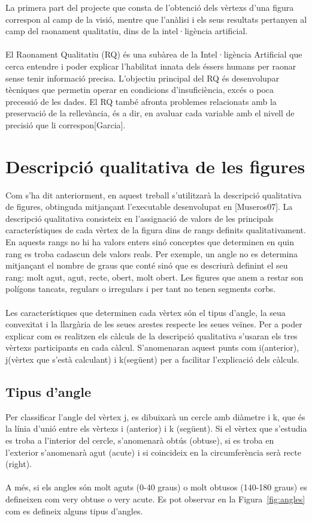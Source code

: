 \documentclass{article}
\begin{document}
La primera part del projecte que consta de l'obtenció dels vèrtexs d'una figura correspon al camp de la visió, mentre que l'anàlisi i els seus resultats pertanyen al camp del raonament qualitatiu, dins de la intel·ligència artificial.
\\
\\
El Raonament Qualitatiu (RQ) és una subàrea de la Intel·ligència Artificial que cerca entendre i poder explicar l’habilitat innata dels éssers humans per raonar sense tenir informació precisa.
L’objectiu principal del RQ és desenvolupar tècniques que permetin operar en condicions d’insuficiència, excés o poca precessió de les dades.
El RQ també afronta problemes relacionats amb la preservació de la rellevància, és a dir, en avaluar cada variable amb el nivell de precisió que li correspon[Garcia].

\section{Descripció qualitativa de les figures}
Com s'ha dit anteriorment, en aquest treball s'utilitzarà la descripció qualitativa de figures, obtinguda mitjançant l'executable desenvolupat en [Museros07].
La descripció qualitativa consisteix en l'assignació de valors de les principals característiques de cada vèrtex de la figura dins de rangs definits qualitativament.
En aquests rangs no hi ha valors enters sinó conceptes que determinen en quin rang es troba cadascun dels valors reals.
Per exemple, un angle no es determina mitjançant el nombre de graus que conté sinó que es descriurà definint el seu rang: molt agut, agut, recte, obert, molt obert.
Les figures que anem a restar son polígons tancats, regulars o irregulars i per tant no tenen segments corbs.
\\
\\
Les característiques que determinen cada vèrtex són el tipus d'angle, la seua convexitat i la llargària de les seues arestes respecte les seues veïnes.
Per a poder explicar com es realitzen els càlculs de la descripció qualitativa s'usaran els tres vèrtexs participants en cada càlcul.
S'anomenaran aquest punts com i(anterior), j(vèrtex que s'està calculant) i k(següent) per a facilitar l'explicació dels càlculs.
\\
\subsection{Tipus d'angle}
Per classificar l'angle del vèrtex j, es dibuixarà un cercle amb diàmetre i k, que és la línia d'unió entre els vèrtexs i (anterior) i k (següent).
Si el vèrtex que s'estudia es troba a l'interior del cercle, s'anomenarà obtús (obtuse), si es troba en l'exterior s'anomenarà agut (acute) i si coincideix en la circumferència serà recte (right).
\\
\\
A més, si els angles són molt aguts (0-40 graus) o molt obtusos (140-180 graus) es defineixen com very obtuse o very acute.
Es pot observar en la Figura~\ref{fig:angles} com es defineix alguns tipus d'angles.
\\
\end{document}
